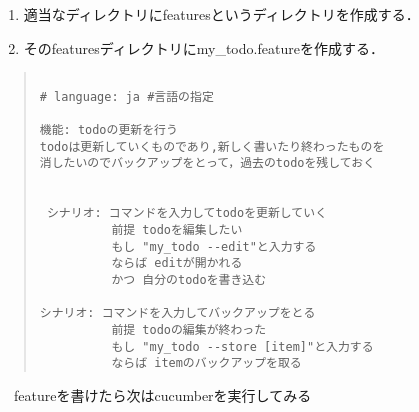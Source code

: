 \begin{enumerate}
\item 適当なディレクトリにfeaturesというディレクトリを作成する．
\item そのfeaturesディレクトリにmy\_todo.featureを作成する．
\end{enumerate}\begin{quote}\begin{verbatim}

# language: ja #言語の指定

機能: todoの更新を行う
todoは更新していくものであり,新しく書いたり終わったものを
消したいのでバックアップをとって，過去のtodoを残しておく


 シナリオ: コマンドを入力してtodoを更新していく
          前提 todoを編集したい
          もし "my_todo --edit"と入力する
          ならば editが開かれる
          かつ 自分のtodoを書き込む

シナリオ: コマンドを入力してバックアップをとる
          前提 todoの編集が終わった
          もし "my_todo --store [item]"と入力する
          ならば itemのバックアップを取る

\end{verbatim}\end{quote}
　featureを書けたら次はcucumberを実行してみる
